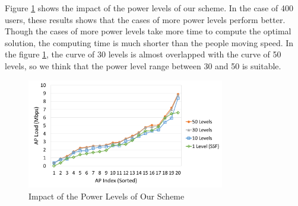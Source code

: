 Figure \ref{fig:Levels} shows the impact of the power levels of our scheme. In the case of 400 users, these results shows that the cases of more power levels perform better. Though the cases of more power levels take more time to compute the optimal solution, the computing time is much shorter than the people moving speed. In the figure \ref{fig:Levels}, the curve of 30 levels is almost overlapped with the curve of 50 levels, so we think that the power level range between 30 and 50 is suitable.

\begin{figure}[tbp]
\begin{center}
\includegraphics[width=3.4in]{images/Levels.png}
\end{center}
\caption{Impact of the Power Levels of Our Scheme}
\label{fig:Levels}
\end{figure}
